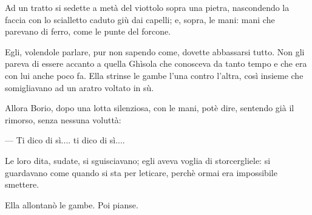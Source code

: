 Ad un tratto si sedette a metà del viottolo sopra una pietra, nascondendo la faccia con lo scialletto caduto giù dai capelli; e, sopra, le mani: mani che parevano di ferro, come le punte del forcone.

Egli, volendole parlare, pur non sapendo come, dovette abbassarsi tutto. Non gli pareva di essere accanto a quella Ghìsola che conosceva da tanto tempo e che era con lui anche poco fa. Ella strinse le gambe l'una contro l'altra, così insieme che somigliavano ad un aratro voltato in sù.

Allora Borio, dopo una lotta silenziosa, con le mani, potè dire, sentendo già il rimorso, senza nessuna voluttà:

— Ti dico di sì.... ti dico di sì....

Le loro dita, sudate, si sguisciavano; egli aveva voglia di storcergliele: si guardavano come quando si sta per leticare, perchè ormai era impossibile smettere.

Ella allontanò le gambe. Poi pianse.
